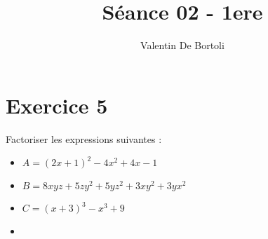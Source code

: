 \documentclass[10pt,a4paper]{article}
\title{Séance 02 - 1ere}
\author{Valentin De Bortoli}
\begin{document}
\section{Exercice 5}
Factoriser les expressions suivantes :
\begin{itemize}
\item $A = (2x+1) ^2 - 4x^2 +4x -1$
\item $B = 8xyz + 5zy^2 + 5 yz^2 + 3xy^2 + 3yx^2$
\item $C = (x+3)^3 - x^3 + 9$
\item
\end{itemize}

\end{document}
